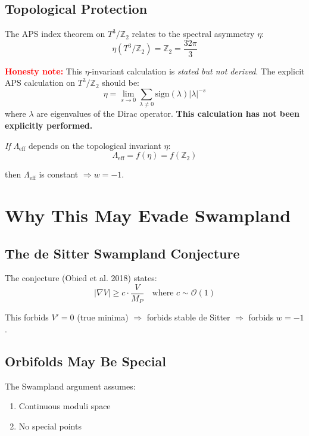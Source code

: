 \documentclass[12pt,a4paper]{article}
\begin{document}
\subsection{Topological Protection}

The APS index theorem on $T^3/\mathbb{Z}_2$ relates to the spectral asymmetry $\eta$:
\begin{equation}
\eta(T^3/\mathbb{Z}_2) = \mathbb{Z}_2 = \frac{32\pi}{3}
\end{equation}

\textcolor{red}{\textbf{Honesty note:}} This $\eta$-invariant calculation is \textit{stated but not derived}. The explicit APS calculation on $T^3/\mathbb{Z}_2$ should be:
\begin{equation}
\eta = \lim_{s \to 0} \sum_{\lambda \neq 0} \text{sign}(\lambda) |\lambda|^{-s}
\end{equation}
where $\lambda$ are eigenvalues of the Dirac operator. \textbf{This calculation has not been explicitly performed.}

\textit{If} $\Lambda_{\text{eff}}$ depends on the topological invariant $\eta$:
\begin{equation}
\Lambda_{\text{eff}} = f(\eta) = f(\mathbb{Z}_2)
\end{equation}

then $\Lambda_{\text{eff}}$ is constant $\Rightarrow w = -1$.

\section{Why This May Evade Swampland}

\subsection{The de Sitter Swampland Conjecture}

The conjecture (Obied et al. 2018) states:
\begin{equation}
|\nabla V| \geq c \cdot \frac{V}{M_P} \quad \text{where } c \sim \mathcal{O}(1)
\end{equation}

This forbids $V' = 0$ (true minima) $\Rightarrow$ forbids stable de Sitter $\Rightarrow$ forbids $w = -1$.

\subsection{Orbifolds May Be Special}

The Swampland argument assumes:
\begin{enumerate}
    \item Continuous moduli space
    \item No special points
\end{enumerate}
\end{document}
